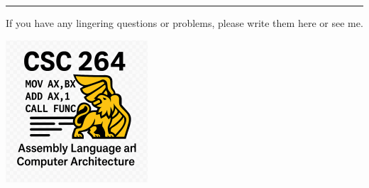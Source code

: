\documentclass[letterpaper,12pt]{exam}
\begin{document}
\begin{questions}
\begin{samepage}
\begin{verbatim}
    \end{verbatim}
    \vspace{5mm}
\end{samepage}
\par
   
 










\end{questions} 
\begin{center}
    \rule{0.667\textwidth}{.8pt} %
\end{center}


If you have any lingering questions or problems, please write them here or see me.
\vfill
\begin{center}
\includegraphics{../csc264Logo}
\end{center}
\end{document}
